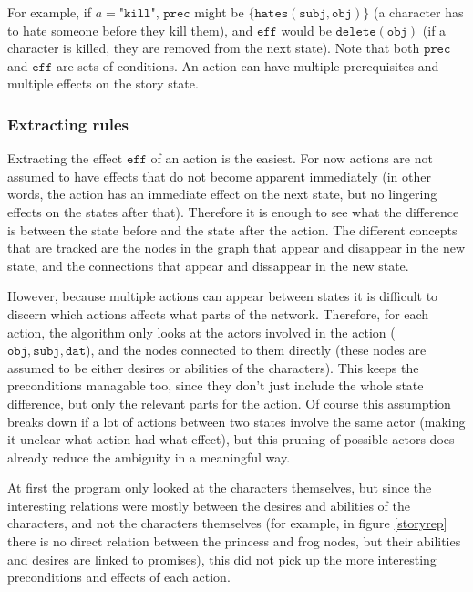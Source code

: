 \begin{itemize}
For example, if $a = \texttt{"kill"}$, $\texttt{prec}$ might be 
$ \{\texttt{hates}(\texttt{subj}, \texttt{obj})\} $ (a character has to hate someone 
before they kill them), and $\texttt{eff}$ would be ${\texttt{delete}(\texttt{obj})}$
(if a character is killed, they are removed from the next state).
Note that both $\texttt{prec}$ and $\texttt{eff}$ are sets of conditions.
An action can have multiple prerequisites and multiple effects on the story state.

\end{itemize}

\subsubsection{Extracting rules}

Extracting the effect $\texttt{eff}$ of an action is the easiest. For now
actions are not assumed to have effects that do not become apparent immediately
(in other words, the action has an immediate effect on the next state, but no
lingering effects on the states after that).
Therefore it is enough to see what the difference is between the state before
and the state after the action. The different concepts that are tracked are the
nodes in the graph that appear and disappear in the new state, and the
connections that appear and dissappear in the new state.

However, because multiple actions can appear between states it is difficult to
discern which actions affects what parts of the network. 
Therefore, for each action, the algorithm only looks at the actors involved in 
the action ($\texttt{obj}, \texttt{subj}, \texttt{dat}$), and the nodes
connected to them directly (these nodes are assumed to be either desires or
abilities of the characters). This keeps the preconditions managable too, since
they don't just include the whole state difference, but only the relevant parts
for the action. Of course this assumption breaks down if a lot of actions
between two states
involve the same actor (making it unclear what action had what effect), but this pruning of possible actors does already reduce
the ambiguity in a meaningful way.

At first the program only looked at the characters themselves, but since the
interesting relations were mostly between the desires and abilities of the
characters, and not the characters themselves (for example, in figure
\ref{storyrep} there is no direct relation between the princess and frog nodes,
but their abilities and desires are linked to promises), this did not pick up the more
interesting preconditions and effects of each action.

